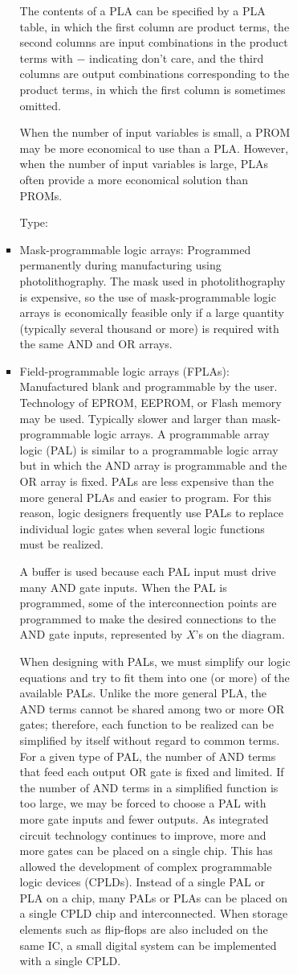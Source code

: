 \documentclass[a4paper,12pt]{article}
\begin{document}
\begin{itemize}
\begin{itemize}
\begin{itemize}
\begin{itemize}
\begin{itemize}
\begin{itemize}
\begin{itemize}
The contents of a PLA can be specified by a PLA table, in which the first column are product terms, the second columns are input combinations in the product terms with $-$ indicating don't care, and the third columns are output combinations corresponding to the product terms, in which the first column is sometimes omitted.

When the number of input variables is small, a PROM may be more economical to use than a PLA. However, when the number of input variables is large, PLAs often provide a more economical solution than PROMs.

Type:
\bit
\item Mask-programmable logic arrays: Programmed permanently during manufacturing using photolithography. The mask used in photolithography is expensive, so the use of mask-programmable logic arrays is economically feasible only if a large quantity (typically several thousand or more) is required with the same AND and OR arrays.
\item Field-programmable logic arrays (FPLAs): Manufactured blank and programmable by the user. Technology of EPROM, EEPROM, or Flash memory may be used. Typically slower and larger than mask-programmable logic arrays.
\eit
{}
A programmable array logic (PAL) is similar to a programmable logic array but in which the AND array is programmable and the OR array is fixed. PALs are less expensive than the more general PLAs and easier to program. For this reason, logic designers frequently use PALs to replace individual logic gates when several logic functions must be realized.

A buffer is used because each PAL input must drive many AND gate inputs. When the PAL is programmed, some of the interconnection points are programmed to make the desired connections to the AND gate inputs, represented by $X$'s on the diagram.

When designing with PALs, we must simplify our logic equations and try to fit them into one (or more) of the available PALs. Unlike the more general PLA, the AND terms cannot be shared among two or more OR gates; therefore, each function to be realized can be simplified by itself without regard to common terms. For a given type of PAL, the number of AND terms that feed each output OR gate is fixed and limited. If the number of AND terms in a simplified function is too large, we may be forced to choose a PAL with more gate inputs and fewer outputs.
As integrated circuit technology continues to improve, more and more gates can be placed on a single chip. This has allowed the development of complex programmable logic devices (CPLDs). Instead of a single PAL or PLA on a chip, many PALs or PLAs can be placed on a single CPLD chip and interconnected. When storage elements such as flip-flops are also included on the same IC, a small digital system can be implemented with a single CPLD.


\end{itemize}
\end{itemize}
\end{itemize}
\end{itemize}
\end{itemize}
\end{itemize}
\end{itemize}
\end{document}
